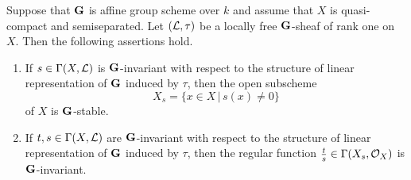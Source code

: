 \begin{proposition}\label{proposition:representation_on_global_sections_of_line_bundle_properties}
Suppose that $\mathbf{G}$ is affine group scheme over $k$ and assume that $X$ is quasi-compact and semiseparated. Let $({\mathcal L},\tau)$ be a locally free $\mathbf{G}$-sheaf of rank one on $X$. Then the following assertions hold.
\begin{enumerate}[label=\emph{\textbf{(\arabic*)}}, leftmargin=3.0em]
\item If $s\in \Gamma(X,{\mathcal L})$ is $\mathbf{G}$-invariant with respect to the structure of linear representation of $\mathbf{G}$ induced by $\tau$, then the open subscheme 
$$X_s = \big\{x\in  X\,\big|\,s(x)\neq 0\big\}$$
of $X$ is $\mathbf{G}$-stable.
\item If $t,s\in \Gamma(X,{\mathcal L})$ are $\mathbf{G}$-invariant with respect to the structure of linear representation of $\mathbf{G}$ induced by $\tau$, then the regular function $\frac{t}{s}\in \Gamma(X_s,{\mathcal O}_X)$ is $\mathbf{G}$-invariant.
\end{enumerate}
\end{proposition}
